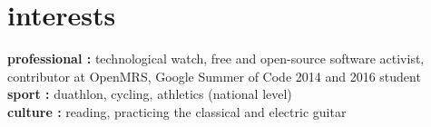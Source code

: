 \documentclass[]{cv-style}          %
\begin{document}




\section{interests}
  \vspace{-0.2cm}

\textbf{professional :} technological watch,  free and open-source software activist, contributor at OpenMRS, Google Summer of Code 2014 and 2016 student\\
\textbf{sport :} duathlon, cycling, athletics (national level) \\
\textbf{culture :} reading, practicing the classical and electric guitar
\end{document}
